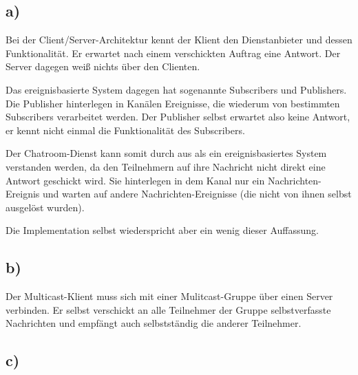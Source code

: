 \subsection*{a)}
Bei der Client/Server-Architektur kennt der Klient den Dienstanbieter und dessen Funktionalität.
Er erwartet nach einem verschickten Auftrag eine Antwort. 
Der Server dagegen weiß nichts über den Clienten.

Das ereignisbasierte System dagegen hat sogenannte Subscribers und Publishers.
Die Publisher hinterlegen in Kanälen Ereignisse, die wiederum von bestimmten Subscribers verarbeitet werden. 
Der Publisher selbst erwartet also keine Antwort, er kennt nicht einmal die Funktionalität des Subscribers.

Der Chatroom-Dienst kann somit durch aus als ein ereignisbasiertes System verstanden werden, da den Teilnehmern auf ihre Nachricht nicht direkt eine Antwort geschickt wird. Sie hinterlegen in dem Kanal nur ein Nachrichten-Ereignis und warten auf andere Nachrichten-Ereignisse (die nicht von ihnen selbst ausgelöst wurden).

Die Implementation selbst wiederspricht aber ein wenig dieser Auffassung.

\subsection*{b)}
Der Multicast-Klient muss sich mit einer Mulitcast-Gruppe über einen Server verbinden.
Er selbst verschickt an alle Teilnehmer der Gruppe selbstverfasste Nachrichten und empfängt auch selbstständig die anderer Teilnehmer.


\subsection*{c)}
